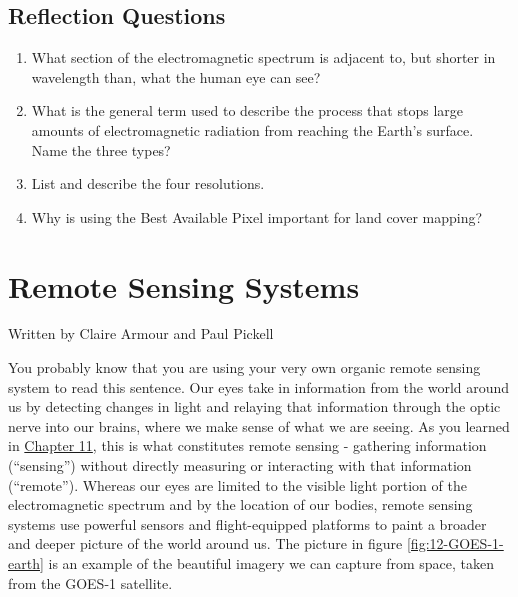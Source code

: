 \documentclass[
]{book}
\providecommand{\tightlist}{%
  \setlength{\itemsep}{0pt}\setlength{\parskip}{0pt}}
\begin{document}
\hypertarget{reflection-questions-7}{%
\section{Reflection Questions}\label{reflection-questions-7}}

\begin{enumerate}
\def\labelenumi{\arabic{enumi}.}
\tightlist
\item
  What section of the electromagnetic spectrum is adjacent to, but
  shorter in wavelength than, what the human eye can see?
\item
  What is the general term used to describe the process that stops
  large amounts of electromagnetic radiation from reaching the Earth's
  surface. Name the three types?
\item
  List and describe the four resolutions.
\item
  Why is using the Best Available Pixel important for land cover
  mapping?
\end{enumerate}

\hypertarget{remote-sensing-systems}{%
\chapter{Remote Sensing Systems}\label{remote-sensing-systems}}

Written by
Claire Armour and Paul Pickell

You probably know that you are using your very own organic remote sensing system to read this sentence. Our eyes take in information from the world around us by detecting changes in light and relaying that information through the optic nerve into our brains, where we make sense of what we are seeing. As you learned in \href{https://ubc-geomatics-textbook.github.io/geomatics-textbook/fundamentals-of-remote-sensing.html}{Chapter 11}, this is what constitutes remote sensing - gathering information (``sensing'') without directly measuring or interacting with that information (``remote''). Whereas our eyes are limited to the visible light portion of the electromagnetic spectrum and by the location of our bodies, remote sensing systems use powerful sensors and flight-equipped platforms to paint a broader and deeper picture of the world around us. The picture in figure \ref{fig:12-GOES-1-earth} is an example of the beautiful imagery we can capture from space, taken from the GOES-1 satellite.
\end{document}
